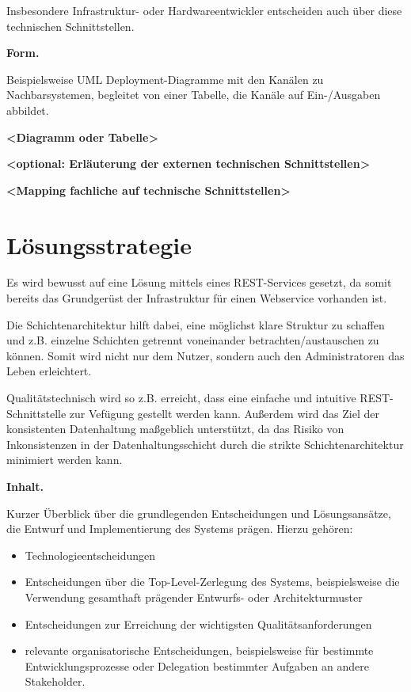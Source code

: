 \documentclass[]{article}
\begin{document}
Insbesondere Infrastruktur- oder Hardwareentwickler entscheiden auch
über diese technischen Schnittstellen.

\textbf{Form.}

Beispielsweise UML Deployment-Diagramme mit den Kanälen zu
Nachbarsystemen, begleitet von einer Tabelle, die Kanäle auf
Ein-/Ausgaben abbildet.

\textbf{\textless{}Diagramm oder Tabelle\textgreater{}}

\textbf{\textless{}optional: Erläuterung der externen technischen
Schnittstellen\textgreater{}}

\textbf{\textless{}Mapping fachliche auf technische
Schnittstellen\textgreater{}}

\section{Lösungsstrategie}\label{section-solution-strategy}

Es wird bewusst auf eine Lösung mittels eines REST-Services gesetzt, da somit bereits das Grundgerüst der Infrastruktur für einen Webservice vorhanden ist.

Die Schichtenarchitektur hilft dabei, eine möglichst klare Struktur zu schaffen und z.B. einzelne Schichten getrennt voneinander betrachten/austauschen zu können. Somit wird nicht nur dem Nutzer, sondern auch den Administratoren das Leben erleichtert.

Qualitätstechnisch wird so z.B. erreicht, dass eine einfache und intuitive REST-Schnittstelle zur Vefügung gestellt werden kann. Außerdem wird das Ziel der konsistenten Datenhaltung maßgeblich unterstützt, da das Risiko von Inkonsistenzen in der Datenhaltungsschicht durch die strikte Schichtenarchitektur minimiert werden kann.

\textbf{Inhalt.}

Kurzer Überblick über die grundlegenden Entscheidungen und
Lösungsansätze, die Entwurf und Implementierung des Systems prägen.
Hierzu gehören:

\begin{itemize}
\item
  Technologieentscheidungen
\item
  Entscheidungen über die Top-Level-Zerlegung des Systems,
  beispielsweise die Verwendung gesamthaft prägender Entwurfs- oder
  Architekturmuster
\item
  Entscheidungen zur Erreichung der wichtigsten Qualitätsanforderungen
\item
  relevante organisatorische Entscheidungen, beispielsweise für
  bestimmte Entwicklungsprozesse oder Delegation bestimmter Aufgaben an
  andere Stakeholder.
\end{itemize}
\end{document}
